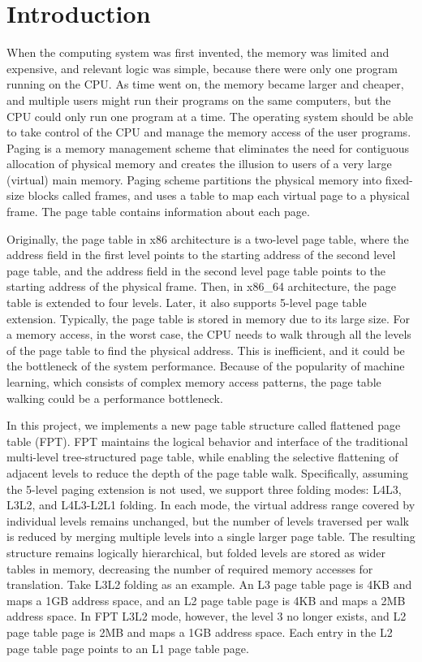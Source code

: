 \section{Introduction}
\label{sec:introduction}

When the computing system was first invented, the memory was limited and expensive, and relevant logic was simple, because there were only one program running on the CPU. As time went on, the memory became larger and cheaper, and multiple users might run their programs on the same computers, but the CPU could only run one program at a time. The operating system should be able to take control of the CPU and manage the memory access of the user programs. Paging is a memory management scheme that eliminates the need for contiguous allocation of physical memory and creates the illusion to users of a very large (virtual) main memory. Paging scheme partitions the physical memory into fixed-size blocks called frames, and uses a table to map each virtual page to a physical frame. The page table contains information about each page.

Originally, the page table in x86 architecture is a two-level page table, where the address field in the first level points to the starting address of the second level page table, and the address field in the second level page table points to the starting address of the physical frame. Then, in x86\_64 architecture, the page table is extended to four levels. Later, it also supports 5-level page table extension. Typically, the page table is stored in memory due to its large size. For a memory access, in the worst case, the CPU needs to walk through all the levels of the page table to find the physical address. This is inefficient, and it could be the bottleneck of the system performance. Because of the popularity of machine learning, which consists of complex memory access patterns, the page table walking could be a performance bottleneck.

In this project, we implements a new page table structure called flattened page table (FPT). FPT maintains the logical behavior and interface of the traditional multi-level tree-structured page table, while enabling the selective flattening of adjacent levels to reduce the depth of the page table walk. Specifically, assuming the 5-level paging extension is not used, we support three folding modes: L4L3, L3L2, and L4L3-L2L1 folding. In each mode, the virtual address range covered by individual levels remains unchanged, but the number of levels traversed per walk is reduced by merging multiple levels into a single larger page table. The resulting structure remains logically hierarchical, but folded levels are stored as wider tables in memory, decreasing the number of required memory accesses for translation. Take L3L2 folding as an example. An L3 page table page is 4KB and maps a 1GB address space, and an L2 page table page is 4KB and maps a 2MB address space. In FPT L3L2 mode, however, the level 3 no longer exists, and L2 page table page is 2MB and maps a 1GB address space. Each entry in the L2 page table page points to an L1 page table page.
